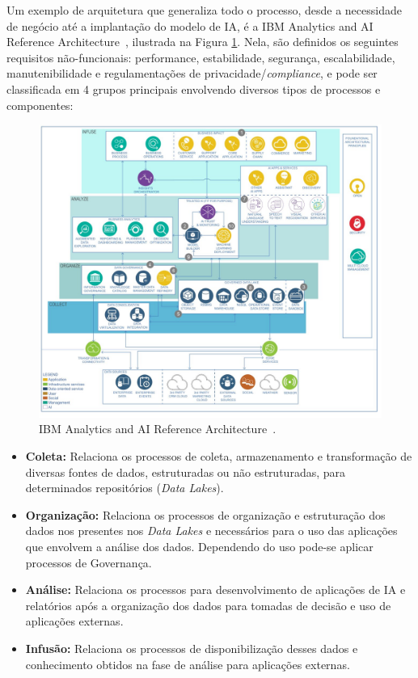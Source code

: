 \documentclass[portugues]{ic-tese}
\begin{document}
Um exemplo de arquitetura que generaliza todo o processo, desde a necessidade de negócio até a implantação do modelo de IA, é a IBM Analytics and AI Reference Architecture~\citep{IBM_2021}, ilustrada na Figura \ref{fig:AIReferenceArchitecture}. Nela, são definidos os seguintes requisitos não-funcionais: performance, estabilidade, segurança, escalabilidade, manutenibilidade e regulamentações de privacidade/\textit{compliance}, e pode ser classificada em 4 grupos principais envolvendo diversos tipos de processos e componentes:

\begin{figure}[h]
\centering
\includegraphics[scale=0.25]{images/ai-analytics-ref-diagram-analyze.jpg}
\caption {IBM Analytics and AI Reference Architecture~\citep{IBM_2021}.}
\label{fig:AIReferenceArchitecture}
\end{figure}

\begin{itemize}
\item \textbf{Coleta:} Relaciona os processos de coleta, armazenamento e transformação de diversas fontes de dados, estruturadas ou não estruturadas, para determinados repositórios (\textit{Data Lakes}).
\item \textbf{Organização:} Relaciona os processos de organização e estruturação dos dados nos presentes nos \textit{Data Lakes} e necessários para o uso das aplicações que envolvem a análise dos dados. Dependendo do uso pode-se aplicar processos de Governança.
\item \textbf{Análise:} Relaciona os processos para desenvolvimento de aplicações de IA e relatórios após a organização dos dados para tomadas de decisão e uso de aplicações externas.
\item \textbf{Infusão:} Relaciona os processos de disponibilização desses dados e conhecimento obtidos na fase de análise para aplicações externas.
\end{itemize}
\end{document}
